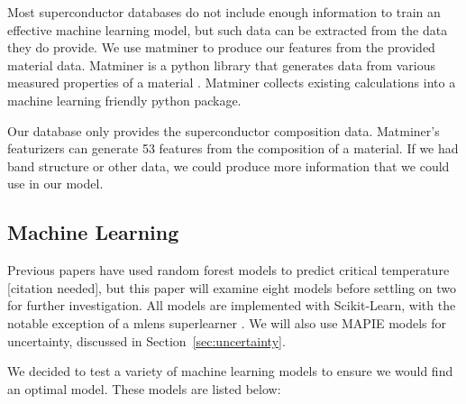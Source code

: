 \documentclass[twocolumn, nofootinbib, secnumarabic, amssymb, nobibnotes, aps, prd]{revtex4-2}
\begin{document}
Most superconductor databases do not include enough information to train an effective machine learning model, but such data can be extracted from the data they do provide. We use matminer to produce our features from the provided material data. Matminer is a python library that generates data from various measured properties of a material \cite{WARD201860}. Matminer collects existing calculations into a machine learning friendly python package. %


Our database only provides the superconductor composition data. Matminer's featurizers can generate 53 features from the composition of a material. If we had band structure or other data, we could produce more information that we could use in our model.

\subsection{Machine Learning}

Previous papers have used random forest models to predict critical temperature [citation needed], but this paper will examine eight models before settling on two for further investigation. All models are implemented with Scikit-Learn, with the notable exception of a mlens superlearner \cite{scikit-learn, flennerhag:2017mlens}. We will also use MAPIE models for uncertainty, discussed in Section~\ref{sec:uncertainty}.

We decided to test a variety of machine learning models to ensure we would find an optimal model. These models are listed below:
\end{document}
